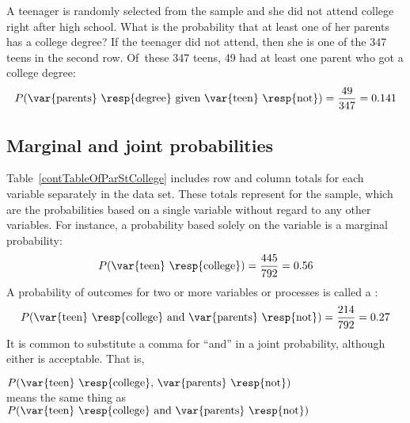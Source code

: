 \begin{example}{A teenager is randomly selected from the sample and she did not attend college right after high school. What is the probability that at least one of her parents has a college degree?}\label{collegeProbOfParentsGivenStudentNot}
If the teenager did not attend, then she is one of the 347 teens in the second row. Of~these 347 teens, 49 had at least one parent who got a college degree:
\begin{eqnarray*}
P(\text{\var{parents} \resp{degree} given \var{teen} \resp{not}}) = \frac{49}{347} = 0.141
\end{eqnarray*}
\end{example}

\subsection{Marginal and joint probabilities}
\label{marginalAndJointProbabilities}


Table~\ref{contTableOfParStCollege} includes row and column totals for each variable separately in the  data set. These totals represent  for the sample, which are the probabilities based on a single variable without regard to any other variables. For instance, a probability based solely on the  variable is a marginal probability:
\begin{align*}
P(\text{\var{teen} \resp{college}}) = \frac{445}{792} = 0.56
\end{align*}
A probability of outcomes for two or more variables or processes is called a :
\begin{align*}
P(\text{\var{teen} \resp{college} and \var{parents} \resp{not}}) = \frac{214}{792} = 0.27
\end{align*}
It is common to substitute a comma for ``and'' in a joint probability, although either is acceptable. That is,
\begin{center}
$P(\text{\var{teen} \resp{college}, \var{parents} \resp{not}})$ \\[2mm]
means the same thing as \\[2mm]
$P(\text{\var{teen} \resp{college} and \var{parents} \resp{not}})$
\end{center}

